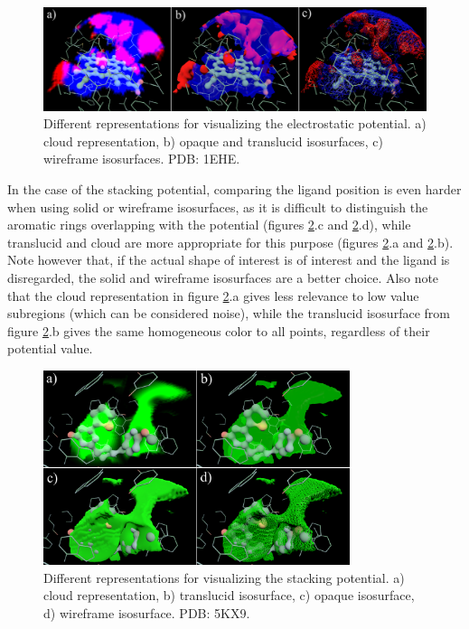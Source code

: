     \begin{figure}[H]
      \centering
      \includegraphics[width=1\textwidth]{figures/results/reprs_0.png}
      \caption{\label{fig:results/reprs_0} Different representations for visualizing the electrostatic potential. a) cloud representation, b) opaque and translucid isosurfaces, c) wireframe isosurfaces. PDB: 1EHE.}
    \end{figure}

    In the case of the stacking potential, comparing the ligand position is even harder when using solid or wireframe isosurfaces, as it is difficult to distinguish the aromatic rings overlapping with the potential (figures \ref{fig:results/reprs_1}.c and \ref{fig:results/reprs_1}.d), while translucid and cloud are more appropriate for this purpose (figures \ref{fig:results/reprs_1}.a and \ref{fig:results/reprs_1}.b). Note however that, if the actual shape of interest is of interest and the ligand is disregarded, the solid and wireframe isosurfaces are a better choice. Also note that the cloud representation in figure \ref{fig:results/reprs_1}.a gives less relevance to low value subregions (which can be considered noise), while the translucid isosurface from figure \ref{fig:results/reprs_1}.b gives the same homogeneous color to all points, regardless of their potential value.

    \begin{figure}[H]
      \centering
      \includegraphics[width=0.8\textwidth]{figures/results/reprs_1.png}
      \caption{\label{fig:results/reprs_1} Different representations for visualizing the stacking potential. a) cloud representation, b) translucid isosurface, c) opaque isosurface, d) wireframe isosurface. PDB: 5KX9.}
    \end{figure}

